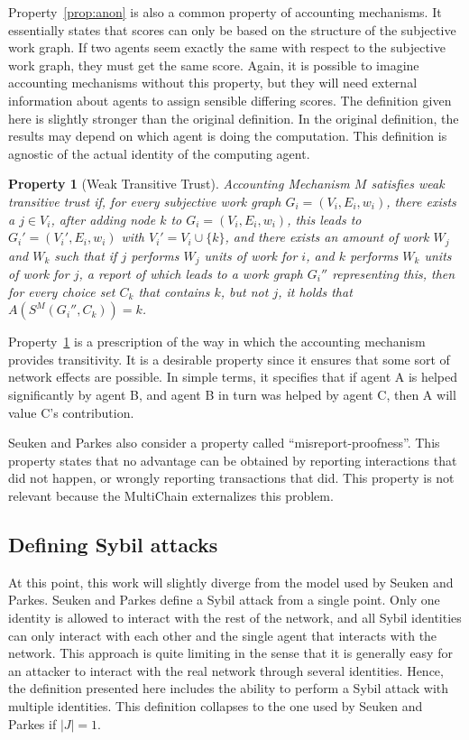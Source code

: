 \documentclass[a4paper,11pt]{book}
\newtheorem{property}{Property}
\theoremstyle{definition}
\begin{document}
Property~\ref{prop:anon} is also a common property of accounting mechanisms. It essentially states that
scores can only be based on the structure of the subjective work graph. If two agents seem exactly the
same with respect to the subjective work graph, they must get the same score. Again, it is possible
to imagine accounting mechanisms without this property, but they will  need external information
about agents to assign sensible differing scores.
The definition given here is slightly stronger than the original definition. In the original definition,
the results may depend on which agent is doing the computation. This definition is agnostic of the
actual identity of the computing agent.


\begin{property}[Weak Transitive Trust]
    Accounting Mechanism $M$ satisfies weak transitive trust if, for every subjective work graph 
    $G_i = (V_i, E_i, w_i)$, there exists a $j \in V_i$, after adding node $k$ to $G_i = (V_i, E_i, w_i)$,
    this leads to $G_i' = (V_i', E_i, w_i)$ with $V_i' = V_i \cup \{k\}$, and there exists an amount 
    of work $W_j$ and $W_k$ such that if $j$ performs $W_j$ units of work for $i$, and $k$ performs
    $W_k$ units of work for $j$, a report of which leads to a work graph $G_i''$ representing this,
    then for every choice set $C_k$ that contains $k$, but not $j$, it holds that $A(S^M(G_i'', C_k)) = k$.
    \label{prop:wtt}
\end{property}

Property~\ref{prop:wtt} is a prescription of the way in which the accounting mechanism provides transitivity.
It is a desirable property since it ensures that some sort of network effects are possible.
In simple terms, it specifies that if agent A is helped significantly by agent B, and agent B in turn
was helped by agent C, then A will value C's contribution.

Seuken and Parkes also consider a property called ``misreport-proofness''. This property
states that no advantage can be obtained by reporting interactions that did not happen,
or wrongly reporting transactions that did. This property is not relevant because
the MultiChain externalizes this problem. 

\subsection{Defining Sybil attacks}

At this point, this work will slightly diverge from the model used by Seuken and Parkes. 
Seuken and Parkes define a Sybil attack from a single point. Only one identity is allowed
to interact with the rest of the network, and all Sybil identities can only interact with
each other and the single agent that interacts with the network. This approach is quite
limiting in the sense that it is generally easy for an attacker to interact with the 
real network through several identities. Hence, the definition presented here
includes the ability to perform a Sybil attack with multiple identities. This definition
collapses to the one used by Seuken and Parkes if $|J|=1$.
\end{document}

